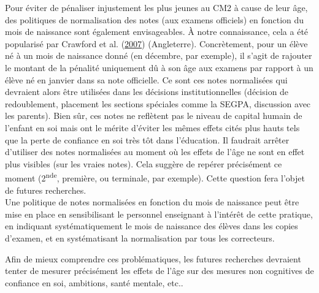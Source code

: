 \documentclass[
]{book}
\begin{document}
\quad Pour éviter de pénaliser injustement les plus jeunes au CM2 à cause de leur âge, des politiques de normalisation des notes (aux examens officiels) en fonction du mois de naissance sont également envisageables. À notre connaissance, cela a été popularisé par Crawford et al. (\protect\hyperlink{ref-CRA:eal:07}{2007}) (Angleterre). Concrètement, pour un élève né à un mois de naissance donné (en décembre, par exemple), il s'agit de rajouter le montant de la pénalité uniquement dû à son âge aux examens par rapport à un élève né en janvier dans sa note officielle. Ce sont ces notes normalisées qui devraient alors être utilisées dans les décisions institutionnelles (décision de redoublement, placement les sections spéciales comme la SEGPA, discussion avec les parents). Bien sûr, ces notes ne reflètent pas le niveau de capital humain de l'enfant en soi mais ont le mérite d'éviter les mêmes effets cités plus hauts tels que la perte de confiance en soi très tôt dans l'éducation. Il faudrait arrêter d'utiliser des notes normalisées au moment où les effets de l'âge ne sont en effet plus visibles (sur les vraies notes). Cela suggère de repérer précisément ce moment (2\textsuperscript{nde}, première, ou terminale, par exemple). Cette question fera l'objet de futures recherches.\\
Une politique de notes normalisées en fonction du mois de naissance peut être mise en place en sensibilisant le personnel enseignant à l'intérêt de cette pratique, en indiquant systématiquement le mois de naissance des élèves dans les copies d'examen, et en systématisant la normalisation par tous les correcteurs.

Afin de mieux comprendre ces problématiques, les futures recherches devraient tenter de mesurer précisément les effets de l'âge sur des mesures non cognitives de confiance en soi, ambitions, santé mentale, etc..
\end{document}

